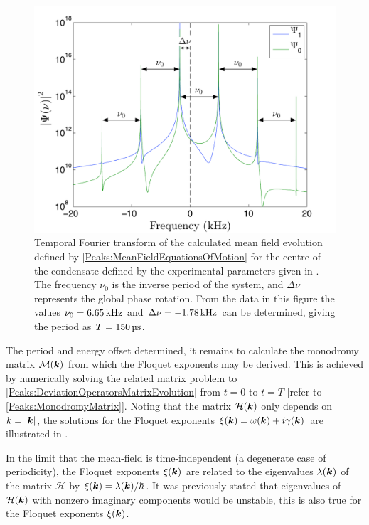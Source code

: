 \begin{figure}
    \centering
    \includegraphics[width=14cm]{MeanFieldFourierTransform}
    \caption{Temporal Fourier transform of the calculated mean field evolution defined by \eqref{Peaks:MeanFieldEquationsOfMotion} for the centre of the condensate defined by the experimental parameters given in . The frequency $\nu_0$ is the inverse period of the system, and $\Delta\nu$ represents the global phase rotation. From the data in this figure the values $\nu_0 = \unit[6.65]{kHz}$ and $\Delta\nu = \unit[-1.78]{kHz}$ can be determined, giving the period as $T=\unit[150]{\micro{}s}$. \label{Peaks:MeanFieldFourierTransform}}
\end{figure}

The period and energy offset determined, it remains to calculate the mono\-dromy matrix $\mathcal{M}(\bm{k})$ from which the Floquet exponents may be derived. This is achieved by numerically solving the related matrix problem to \eqref{Peaks:DeviationOperatorsMatrixEvolution} from $t=0$ to $t=T$ [refer to \eqref{Peaks:MonodromyMatrix}]. Noting that the matrix $\mathcal{H}(\bm{k})$ only depends on $k = \left|\bm{k}\right|$, the solutions for the Floquet exponents $\xi(\bm{k}) = \omega(\bm{k}) + i\gamma(\bm{k})$ are illustrated in .

In the limit that the mean-field is time-independent (a degenerate case of periodicity), the Floquet exponents $\xi(\bm{k})$ are related to the eigenvalues $\lambda(\bm{k})$ of the matrix $\mathcal{H}$ by $\xi(\bm{k}) = \lambda(\bm{k}) / \hbar$. It was previously stated that eigenvalues of $\mathcal{H}(\bm{k})$ with nonzero imaginary components would be unstable, this is also true for the Floquet exponents $\xi(\bm{k})$.

